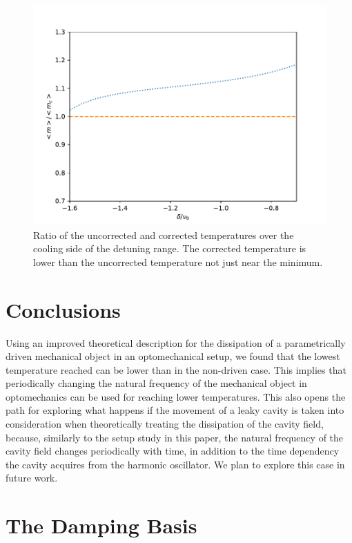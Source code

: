 \documentclass[reprint, amsmath,amssymb, aps,pra]{revtex4-1}
\begin{document}
\begin{figure}
\includegraphics[scale=.5]{TempPropGorden1.pdf}
\caption{Ratio of the uncorrected and corrected temperatures over the cooling side of the detuning range. The corrected temperature is lower than the uncorrected temperature not just near the minimum.}
\label{fig:TempRatio}
\end{figure}




\section{Conclusions}\label{ConCl}

Using an improved theoretical description for the dissipation of a
parametrically driven mechanical object in an optomechanical setup, we
found that the lowest temperature reached can be lower than in the
non-driven case. This implies that periodically changing the natural
frequency of the mechanical object in optomechanics can be used for
reaching lower temperatures. This also opens the path for exploring
what happens if the movement of a leaky cavity is taken into
consideration when theoretically treating the dissipation of the
cavity field, because, similarly to the setup study in this paper, the
natural frequency of the cavity field changes periodically with time,
in addition to the time dependency the cavity acquires from the
harmonic oscillator. We plan to explore this case in future work.
 
\appendix
\section{The Damping Basis}\label{App1}
\end{document}
